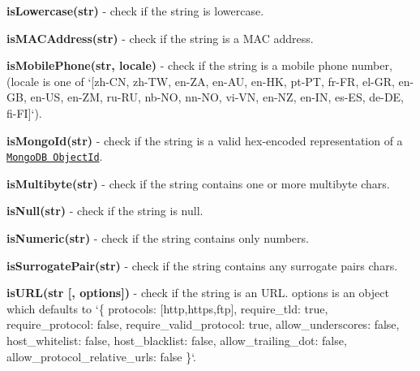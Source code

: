 \begin{DoxyItemize}
\item {\bfseries is\+Lowercase(str)} -\/ check if the string is lowercase.
\item {\bfseries is\+M\+A\+C\+Address(str)} -\/ check if the string is a M\+AC address.
\item {\bfseries is\+Mobile\+Phone(str, locale)} -\/ check if the string is a mobile phone number, (locale is one of `\mbox{[}\textquotesingle{}zh-\/\+CN\textquotesingle{}, \textquotesingle{}zh-\/\+TW\textquotesingle{}, \textquotesingle{}en-\/\+ZA\textquotesingle{}, \textquotesingle{}en-\/\+AU\textquotesingle{}, \textquotesingle{}en-\/\+HK\textquotesingle{}, \textquotesingle{}pt-\/\+PT\textquotesingle{}, \textquotesingle{}fr-\/\+FR\textquotesingle{}, \textquotesingle{}el-\/\+GR\textquotesingle{}, \textquotesingle{}en-\/\+GB\textquotesingle{}, \textquotesingle{}en-\/\+US\textquotesingle{}, \textquotesingle{}en-\/\+ZM\textquotesingle{}, \textquotesingle{}ru-\/\+RU\textquotesingle{}, \textquotesingle{}nb-\/\+NO\textquotesingle{}, \textquotesingle{}nn-\/\+NO\textquotesingle{}, \textquotesingle{}vi-\/\+VN\textquotesingle{}, \textquotesingle{}en-\/\+NZ\textquotesingle{}, \textquotesingle{}en-\/\+IN\textquotesingle{}, \textquotesingle{}es-\/\+ES\textquotesingle{}, \textquotesingle{}de-\/\+DE\textquotesingle{}, \textquotesingle{}fi-\/\+FI\textquotesingle{}\mbox{]}`).
\item {\bfseries is\+Mongo\+Id(str)} -\/ check if the string is a valid hex-\/encoded representation of a \href{http://docs.mongodb.org/manual/reference/object-id/}{\tt Mongo\+DB Object\+Id}.
\item {\bfseries is\+Multibyte(str)} -\/ check if the string contains one or more multibyte chars.
\item {\bfseries is\+Null(str)} -\/ check if the string is null.
\item {\bfseries is\+Numeric(str)} -\/ check if the string contains only numbers.
\item {\bfseries is\+Surrogate\+Pair(str)} -\/ check if the string contains any surrogate pairs chars.
\item {\bfseries is\+U\+R\+L(str \mbox{[}, options\mbox{]})} -\/ check if the string is an U\+RL. {\ttfamily options} is an object which defaults to `\{ protocols\+: \mbox{[}\textquotesingle{}http\textquotesingle{},\textquotesingle{}https\textquotesingle{},\textquotesingle{}ftp\textquotesingle{}\mbox{]}, require\+\_\+tld\+: true, require\+\_\+protocol\+: false, require\+\_\+valid\+\_\+protocol\+: true, allow\+\_\+underscores\+: false, host\+\_\+whitelist\+: false, host\+\_\+blacklist\+: false, allow\+\_\+trailing\+\_\+dot\+: false, allow\+\_\+protocol\+\_\+relative\+\_\+urls\+: false \}`.

\end{DoxyItemize}
